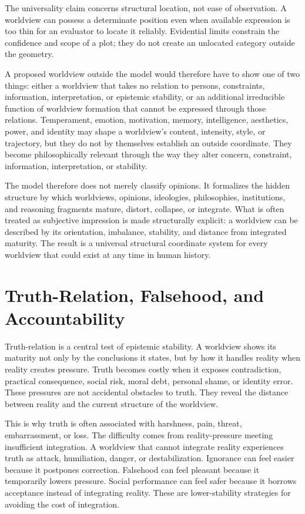 \documentclass[11pt]{article}
\begin{document}
The universality claim concerns structural location, not ease of observation. A worldview can possess a determinate position even when available expression is too thin for an evaluator to locate it reliably. Evidential limits constrain the confidence and scope of a plot; they do not create an unlocated category outside the geometry.

A proposed worldview outside the model would therefore have to show one of two things: either a worldview that takes no relation to persons, constraints, information, interpretation, or epistemic stability, or an additional irreducible function of worldview formation that cannot be expressed through those relations. Temperament, emotion, motivation, memory, intelligence, aesthetics, power, and identity may shape a worldview's content, intensity, style, or trajectory, but they do not by themselves establish an outside coordinate. They become philosophically relevant through the way they alter concern, constraint, information, interpretation, or stability.

The model therefore does not merely classify opinions. It formalizes the hidden structure by which worldviews, opinions, ideologies, philosophies, institutions, and reasoning fragments mature, distort, collapse, or integrate. What is often treated as subjective impression is made structurally explicit: a worldview can be described by its orientation, imbalance, stability, and distance from integrated maturity. The result is a universal structural coordinate system for every worldview that could exist at any time in human history.


\section{Truth-Relation, Falsehood, and Accountability}

Truth-relation is a central test of epistemic stability. A worldview shows its maturity not only by the conclusions it states, but by how it handles reality when reality creates pressure. Truth becomes costly when it exposes contradiction, practical consequence, social risk, moral debt, personal shame, or identity error. These pressures are not accidental obstacles to truth. They reveal the distance between reality and the current structure of the worldview.

This is why truth is often associated with harshness, pain, threat, embarrassment, or loss. The difficulty comes from reality-pressure meeting insufficient integration. A worldview that cannot integrate reality experiences truth as attack, humiliation, danger, or destabilization. Ignorance can feel easier because it postpones correction. Falsehood can feel pleasant because it temporarily lowers pressure. Social performance can feel safer because it borrows acceptance instead of integrating reality. These are lower-stability strategies for avoiding the cost of integration.
\end{document}
